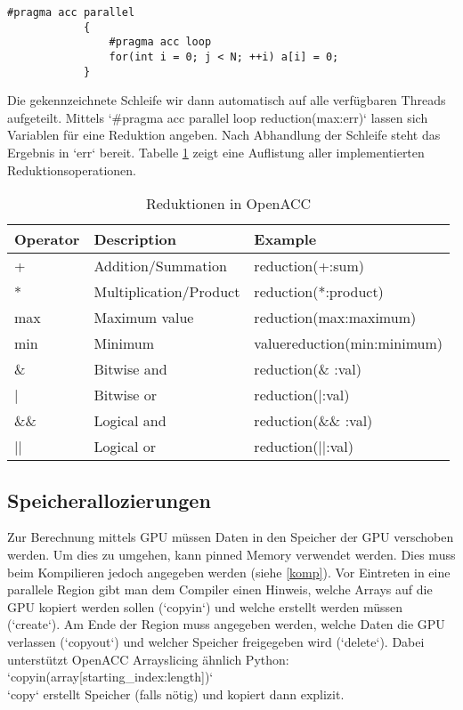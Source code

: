 			\begin{lstlisting}[caption=OpenACC: Loops]
			#pragma acc parallel
			{
				#pragma acc loop
				for(int i = 0; j < N; ++i) a[i] = 0;
			}
			\end{lstlisting}
			
			Die gekennzeichnete Schleife wir dann automatisch auf alle verfügbaren Threads aufgeteilt.
			Mittels \li`#pragma  acc parallel loop reduction(max:err)` lassen sich Variablen für eine Reduktion angeben. Nach Abhandlung der Schleife steht das Ergebnis in \li`err` bereit. Tabelle \ref{tab7:oaccred} zeigt eine Auflistung aller implementierten Reduktionsoperationen.
	
			\begin{table}[h]
			\centering
			\begin{tabular}{|l|l|l|}
				\toprule
				\textbf{Operator} & \textbf{Description} & \textbf{Example} \\\hline\hline
				+ & Addition/Summation & reduction(+:sum) \\\hline
				* & Multiplication/Product & reduction(*:product) \\\hline
		 		max & Maximum value & reduction(max:maximum) \\\hline
				min & Minimum & valuereduction(min:minimum) \\\hline
				\& & Bitwise and & reduction(\& :val) \\\hline
				| & Bitwise or & reduction(|:val) \\\hline
				\&\& & Logical and & reduction(\&\& :val) \\\hline
				|| & Logical or & reduction(||:val) \\\bottomrule
			\end{tabular}
			\caption{Reduktionen in OpenACC}
			\label{tab7:oaccred}
			\end{table}
		
			\subsection{Speicherallozierungen}
			Zur Berechnung mittels GPU müssen Daten in den Speicher der GPU verschoben werden. Um dies zu umgehen, kann pinned Memory verwendet werden. Dies muss beim Kompilieren jedoch angegeben werden (siehe \ref{komp}). Vor Eintreten in eine parallele Region gibt man dem Compiler einen Hinweis, welche Arrays auf die GPU kopiert werden sollen (\li`copyin`) und welche erstellt werden müssen (\li`create`). Am Ende der Region muss angegeben werden, welche Daten die GPU verlassen (\li`copyout`) und welcher Speicher freigegeben wird (\li`delete`). Dabei unterstützt OpenACC Arrayslicing ähnlich Python:\\
			\li`copyin(array[starting_index:length])`\\
			\li`copy` erstellt Speicher (falls nötig) und kopiert dann explizit.
			
